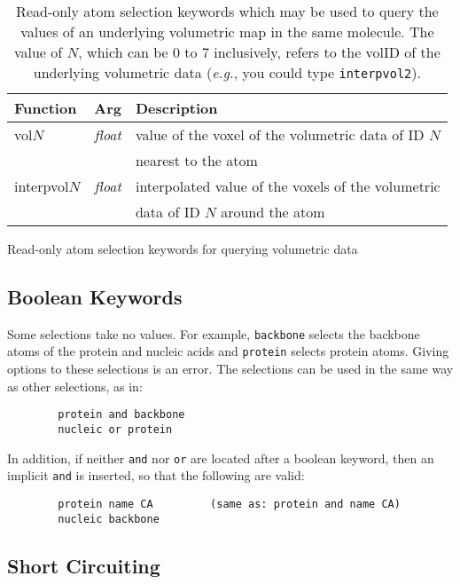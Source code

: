 \begin{table}[htb]
\begin{center}
\begin{tabular}{|l|c|l|} 
  \hline
  Function & Arg & Description\\ 
  \hline\hline
  vol$N$       & \emph{float} & value of the voxel of the volumetric data of ID $N$ \\
               & & nearest to the atom \\
  interpvol$N$ & \emph{float} & interpolated value of the voxels of the volumetric \\
               & & data of ID $N$ around the atom \\ 
  \hline
\end{tabular}
\end{center}
\caption[Read-only atom selection keywords for volumetric map queries]{Read-only atom selection keywords which may be used to query the values
of an underlying volumetric map in the same molecule. The value of $N$, which
can be 0 to 7 inclusively, refers to the volID of the underlying volumetric data
(\emph{e.g.}, you could type {\tt interpvol2}).}{Read-only atom selection
keywords for querying volumetric data}
\label{table:ug:volkeywords}
\end{table}


\subsection{Boolean Keywords}

Some selections take no values.  For example, {\tt backbone}
selects the backbone atoms of the protein and nucleic acids and
{\tt protein} selects protein atoms.
Giving options to these selections is an error.
The selections can be used in the same way as other selections, as in:
\begin{verbatim}
        protein and backbone
        nucleic or protein
\end{verbatim}
In addition, if neither {\tt and} nor {\tt or} are located 
after a boolean keyword, then an implicit {\tt and} is inserted, so
that the following are valid:
\begin{verbatim}
        protein name CA         (same as: protein and name CA)
        nucleic backbone
\end{verbatim}

\subsection{Short Circuiting}
\label{ug:topic:selection:short_circuits}

